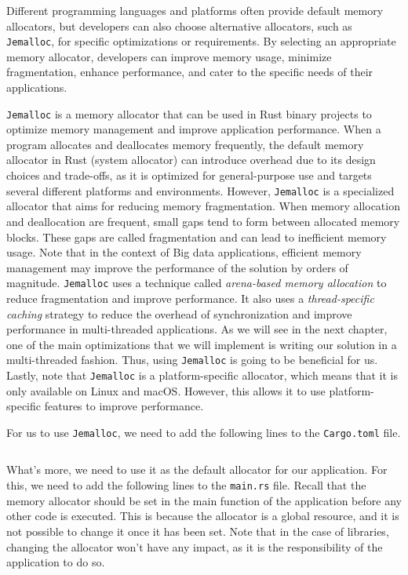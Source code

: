 Different programming languages and platforms often provide default memory allocators, but developers can also choose alternative allocators, such as \texttt{Jemalloc}, for specific optimizations or requirements. By selecting an appropriate memory allocator, developers can improve memory usage, minimize fragmentation, enhance performance, and cater to the specific needs of their applications.

\texttt{Jemalloc} is a memory allocator that can be used in Rust binary projects to optimize memory management and improve application performance. When a program allocates and deallocates memory frequently, the default memory allocator in Rust (system allocator) can introduce overhead due to its design choices and trade-offs, as it is optimized for general-purpose use and targets several different platforms and environments. However, \texttt{Jemalloc} is a specialized allocator that aims for reducing memory fragmentation. When memory allocation and deallocation are frequent, small gaps tend to form between allocated memory blocks. These gaps are called fragmentation and can lead to inefficient memory usage. Note that in the context of Big data applications, efficient memory management may improve the performance of the solution by orders of magnitude. \texttt{Jemalloc} uses a technique called \textit{arena-based memory allocation} to reduce fragmentation and improve performance. It also uses a \textit{thread-specific caching} strategy to reduce the overhead of synchronization and improve performance in multi-threaded applications. As we will see in the next chapter, one of the main optimizations that we will implement is writing our solution in a multi-threaded fashion. Thus, using \texttt{Jemalloc} is going to be beneficial for us. Lastly, note that \texttt{Jemalloc} is a platform-specific allocator, which means that it is only available on Linux and macOS. However, this allows it to use platform-specific features to improve performance.

For us to use \texttt{Jemalloc}, we need to add the following lines to the \texttt{Cargo.toml} file.

\begin{code}
    \inputminted{toml}{code/listings/10-2_cargo.toml}
\end{code}

What's more, we need to use it as the default allocator for our application. For this, we need to add the following lines to the \texttt{main.rs} file. Recall that the memory allocator should be set in the main function of the application before any other code is executed. This is because the allocator is a global resource, and it is not possible to change it once it has been set. Note that in the case of libraries, changing the allocator won't have any impact, as it is the responsibility of the application to do so.

